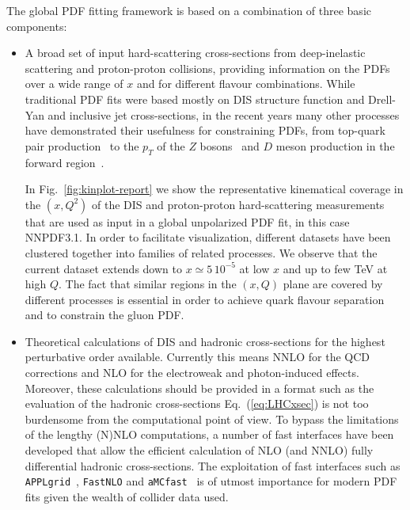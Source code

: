 The global PDF fitting framework is based on a combination of three basic components:
\begin{itemize}
\item A broad set of input hard-scattering cross-sections from deep-inelastic
  scattering and proton-proton collisions, providing information on the PDFs
  over a wide range of $x$ and for different flavour combinations.
  While traditional PDF fits were based mostly on DIS structure function and Drell-Yan
  and inclusive jet
  cross-sections, in the recent years many other processes have demonstrated
  their usefulness for constraining PDFs, from top-quark pair production~\cite{Czakon:2016olj}
  to the $p_T$ of the $Z$ bosons~\cite{Boughezal:2017nla}
  and $D$ meson production in the forward region~\cite{Gauld:2016kpd}.

  In Fig.~\ref{fig:kinplot-report} we show the representative kinematical coverage in the
    $(x,Q^2)$ of the DIS and proton-proton hard-scattering measurements that are
    used as input in a global unpolarized PDF fit, in this case NNPDF3.1.
    In order to facilitate visualization, different
    datasets have been clustered together into families of
    related processes.
    We observe that the current dataset extends down to $x\simeq 5\,10^{-5}$
    at low $x$ and up to few TeV at high $Q$.
    The fact that similar regions in the $(x,Q)$ plane are covered by
    different processes is essential in order to achieve quark
    flavour separation and to constrain the gluon PDF.

  \item Theoretical calculations of DIS and hadronic cross-sections
    for the highest perturbative order available.
    Currently this means NNLO for the QCD corrections and NLO
    for the electroweak and photon-induced effects.
    Moreover, these calculations should be provided in
    a format such as the evaluation of the hadronic
    cross-sections Eq.~(\ref{eq:LHCxsec}) is not too burdensome
    from the computational point of view.
    To bypass the limitations of the lengthy (N)NLO
    computations, a number of fast interfaces have
    been developed that allow the efficient calculation
    of NLO (and NNLO) fully differential hadronic cross-sections.
    The exploitation of fast interfaces such as {\tt APPLgrid}~\cite{Carli:2010rw},
    {\tt FastNLO} and {\tt aMCfast}~\cite{Bertone:2014zva} is of utmost importance
    for modern PDF fits given the wealth of collider data used.


\end{itemize}
